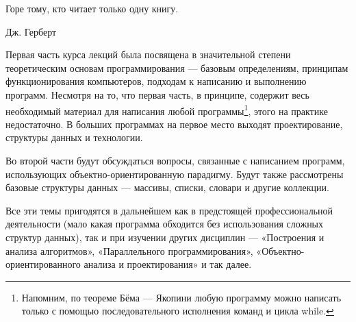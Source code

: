 
\epigraph{Горе тому, кто читает только одну книгу.}{Дж. Герберт}

Первая часть курса лекций была посвящена в значительной степени
теоретическим основам программирования — базовым определениям,
принципам функционирования компьютеров, подходам к написанию и
выполнению программ. Несмотря на то, что первая часть, в принципе,
содержит весь необходимый материал для написания любой
программы\footnote{Напомним, по теореме Бёма — Якопини любую программу
можно написать только с помощью последовательного исполнения команд и
цикла while.}, этого на практике недостаточно. В больших программах на
первое место выходят проектирование, структуры данных и технологии.

Во второй части будут обсуждаться вопросы, связанные с написанием
программ, использующих объектно-ориентированную парадигму. Будут также
рассмотрены базовые структуры данных — массивы, списки, словари и
другие коллекции.

Все эти темы пригодятся в дальнейшем как в предстоящей
профессиональной деятельности (мало какая программа обходится без
использования сложных структур данных), так и при изучении других
дисциплин — «Построения и анализа алгоритмов», «Параллельного
программирования», «Объектно-ориентированного анализа и
проектирования» и так далее.

